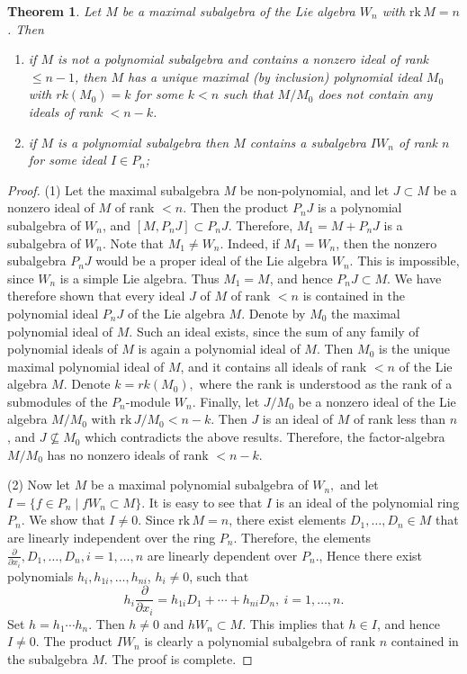 \documentclass[12pt,a4paper]{amsart}
\theoremstyle{plain}
\newtheorem{theorem}{Theorem}
\theoremstyle{definition}
\begin{document}
\begin{theorem} \label{th:poly}
	Let $M$ be a maximal subalgebra of the Lie algebra $W_n$ with
	$\mathrm{rk}\,M=n$.
	Then
	\begin{enumerate}
		\item
		if $M$ is not a polynomial subalgebra and contains a nonzero ideal of
		rank  $\leq n-1$, then $M$ has a unique maximal (by inclusion) polynomial
		ideal $M_0$ with $rk(M_0)=k$ for some $k<n$ such that $M/M_0$ does not contain any ideals of rank
		$<n-k$.
		\item
		if $M$ is a polynomial subalgebra then $M$ contains a subalgebra
		$I W_n$ of rank $n$ for some ideal $I\in P_n$;
		
	\end{enumerate}
\end{theorem}
\begin{proof}
	(1) Let the maximal subalgebra $M$ be non-polynomial, and let $J\subset M$ be a nonzero ideal of $M$
	of rank $<n$.
	Then the  product $P_nJ$ is a polynomial subalgebra of $W_n$, and
	$[M,P_nJ]\subset P_nJ$.
	Therefore, $M_1=M+P_nJ$ is a subalgebra of $W_n$.
	Note that $M_1\ne W_n$.
	Indeed, if $M_1=W_n$, then the nonzero subalgebra $P_nJ$ would be  a proper ideal
	of the Lie algebra $W_n$.
	This is impossible, since  $W_n$ is a simple Lie algebra.
	Thus $M_1=M$,  and  hence $P_nJ\subset M$.
	We have therefore  shown that every ideal $J$ of $M$ of rank $<n$ is contained
	in the polynomial ideal $P_nJ$ of the Lie algebra $M$.
	Denote by $M_0$ the maximal polynomial ideal of $M$. Such an ideal exists, since  the sum of any family of polynomial ideals of $M$
	is again a polynomial ideal of $M$.
	Then $M_0$ is the unique maximal polynomial ideal of $M$, and it
	contains all ideals of rank $<n$ of the Lie algebra $M$. Denote $k=rk(M_0), $ where the rank is understood  as  the rank of a submodules of the $P_n$-module 	$W_n$.
	Finally, let $J/M_0$ be a nonzero ideal of the Lie algebra $M/M_0$
	with $\mathrm{rk}\,J/M_0<n-k.$ 
	Then $J$ is an ideal of $M$ of rank less than $n$, and $J\not \subseteq  M_0$ which
	contradicts the above results.
	Therefore, the  factor-algebra
	$M/M_0$ has no nonzero ideals of rank $<n-k.$ 
	
	(2) Now let $M$ be a maximal polynomial subalgebra of $W_n,$ and let $I=\{f\in P_n\mid fW_n\subset M\}$.
	It is easy to see that $I$ is an ideal of the polynomial ring $P_n$.
	We show that $I\ne0$.
Since $\mathrm{rk}\,M=n$, there exist elements
	$D_1,\ldots,D_n\in M$ that are linearly independent over the ring $P_n$.
	Therefore, the elements
	$\frac{\partial}{\partial x_i},D_1,\ldots,D_n, i=1, \ldots , n$ are linearly dependent over $P_n.$, Hence there exist
	polynomials $h_{i},h_{1i},\ldots,h_{ni}$, $h_i\ne0$, such that
	\[
	h_i\frac{\partial}{\partial x_i} = h_{1i}D_1+\cdots+h_{ni}D_n, \ i=1, \ldots , n.
	\]
	Set $h=h_1\cdots h_n$.
	Then $h\ne0$ and $hW_n\subset M$.
	This implies that  $h\in I$, and  hence $I\ne0$.
	The product $IW_n$ is clearly a polynomial subalgebra of rank $n$
	contained in  the subalgebra $M$.
		The proof is complete.
\end{proof}
\end{document}
